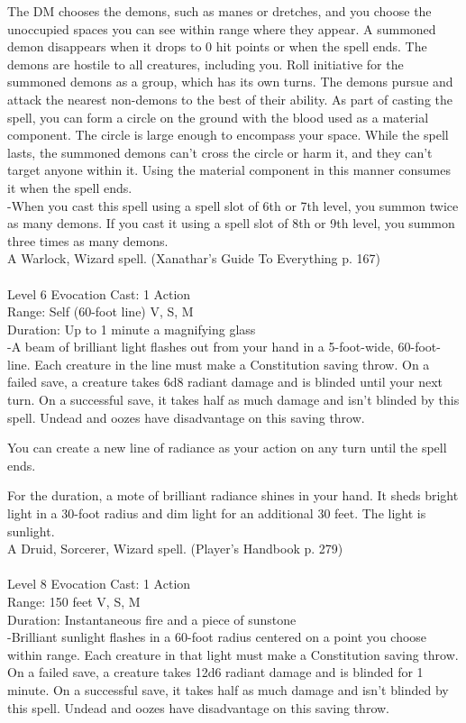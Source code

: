\documentclass[10pt,twocolumn]{report}
\begin{document}
The DM chooses the demons, such as manes or dretches, and you choose the unoccupied spaces you can see within range where they appear. A summoned demon disappears when it drops to 0 hit points or when the spell ends.
The demons are hostile to all creatures, including you. Roll initiative for the summoned demons as a group, which has its own turns. The demons pursue and attack the nearest non-demons to the best of their ability.
As part of casting the spell, you can form a circle on the ground with the blood used as a material component. The circle is large enough to encompass your space. While the spell lasts, the summoned demons can’t cross the circle or harm it, and they can’t target anyone within it. Using the material component in this manner consumes it when the spell ends.\\
-When you cast this spell using a spell slot of 6th or 7th level, you summon twice as many demons. If you cast it using a spell slot of 8th or 9th level, you summon three times as many demons.\\
A Warlock, Wizard spell. (Xanathar's Guide To Everything p. 167) \\


 \\
Level 6 \quad Evocation \quad Cast: 1 Action\\
Range: Self (60-foot line) \quad V, S, M\\
Duration: Up to 1 minute \quad a magnifying glass\\
-A beam of brilliant light flashes out from your hand in a 5-foot-wide, 60-foot-line.
Each creature in the line must make a Constitution saving throw. On a failed save, a creature takes 6d8 radiant damage and is blinded until your next turn. On a successful save, it takes half as much damage and isn’t blinded by this spell. Undead and oozes have disadvantage on this saving throw.

You can create a new line of radiance as your action on any turn until the spell ends.

For the duration, a mote of brilliant radiance shines in your hand. It sheds bright light in a 30-foot radius and dim light for an additional 30 feet. The light is sunlight.\\
A Druid, Sorcerer, Wizard spell. (Player's Handbook p. 279) \\


 \\
Level 8 \quad Evocation \quad Cast: 1 Action\\
Range: 150 feet \quad V, S, M\\
Duration: Instantaneous \quad fire and a piece of sunstone\\
-Brilliant sunlight flashes in a 60-foot radius centered on a point you choose within range.
Each creature in that light must make a Constitution saving throw. On a failed save, a creature takes 12d6 radiant damage and is blinded for 1 minute. On a successful save, it takes half as much damage and isn’t blinded by this spell. Undead and oozes have disadvantage on this saving throw.
\end{document}
